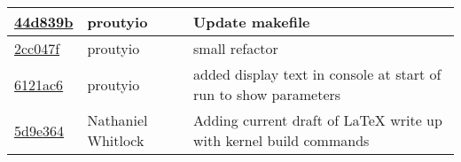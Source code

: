 \begin{tabular}{l | l | l}
\href{https://github.com/proutyio/OSU_CS444/commit/44d839bc92cf0e4ecbe8015cf2857e80e2a9fcf5}{44d839b} & proutyio & Update makefile\\\hline
\href{https://github.com/proutyio/OSU_CS444/commit/2cc047f08a9c3fa13c30905f6ffcf4d3067497d8}{2cc047f} & proutyio & small refactor\\\hline
\href{https://github.com/proutyio/OSU_CS444/commit/6121ac6e5453cab5ffe44448281b842eac6c778e}{6121ac6} & proutyio & added display text in console at start of run to show parameters\\\hline
\href{https://github.com/proutyio/OSU_CS444/commit/5d9e3643d83b9092afdb37d7a98c30c822c2a1e6}{5d9e364} & Nathaniel Whitlock & Adding current draft of LaTeX write up with kernel build commands\\\hline
\end{tabular}
